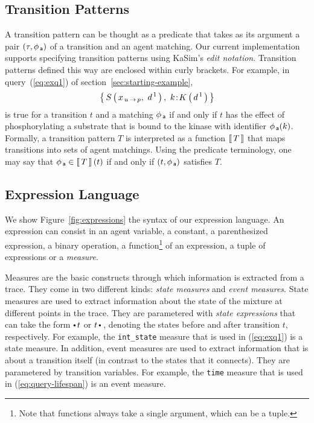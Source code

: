 \documentclass[runningheads]{llncs}
\begin{document}
\subsection{Transition Patterns}\label{subsec:tpats-language}

A transition pattern can be thought as a predicate that takes as its
argument a pair $(\tau, \phi_{\,\textsf{a}})$ of a transition and an agent
matching. Our current implementation supports specifying transition
patterns using KaSim's \emph{edit notation}. Transition patterns
defined this way are enclosed within curly brackets.  For example, in
query~(\ref{eq:exq1}) of section~\ref{sec:starting-example},
\[ \Set{ \AG{S}{x_{\Trans{u}{p}},\ d^{\,1}},\ \iAG{k}{K}{d^{\,1}} } \]
is true for a transition $t$ and a matching $\phi_{\,\textsf{a}}$ if and only
if $t$ has the effect of phosphorylating a substrate that is bound to
the kinase with identifier $\phi_{\,\textsf{a}}(k)$. Formally, a transition
pattern $T$ is interpreted as a function $\left\llbracket \, T \, \right\rrbracket$ that maps
transitions into sets of agent matchings. Using the predicate
terminology, one may say that $\phi_{\,\textsf{a}} \in \left\llbracket \, T \, \right\rrbracket(t)$ if and only
if $(t, \phi_{\,\textsf{a}})$ satisfies $T$.


\subsection{Expression Language}\label{subsec:expr-language}

We show Figure~\ref{fig:expressions} the syntax of our expression
language. An expression can consist in an agent variable, a constant,
a parenthesized expression, a binary operation, a
function\footnote{Note that functions always take a single argument,
  which can be a tuple.} of an expression, a tuple of expressions or a
\emph{measure}.

Measures are the basic constructs through which information is
extracted from a trace. They come in two different kinds: \emph{state
  measures} and \emph{event measures}. State measures are used to
extract information about the state of the mixture at different points
in the trace. They are parametered with \emph{state expressions} that
can take the form $\StateBefore{t}$ or $\StateAfter{t}\,$, denoting
the states before and after transition $t$, respectively. For example,
the \texttt{int\_state} measure that is used in (\ref{eq:exq1}) is a
state measure. In addition, event measures are used to extract
information that is about a transition itself (in contrast to the
states that it connects). They are parametered by transition
variables. For example, the \texttt{time} measure that is used in
(\ref{eq:query-lifespan}) is an event measure.
\end{document}

